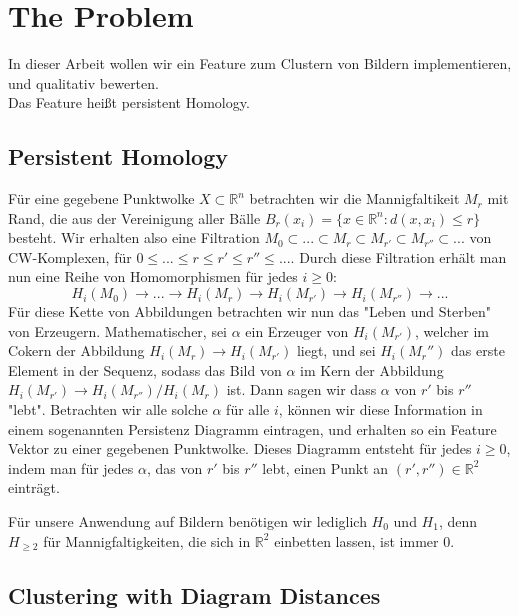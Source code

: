 \documentclass[11pt, a4paper,draft]{report}
\newcommand{\bR}{\mathbb{R}}
\begin{document}
	
	\section*{The Problem}
	
	In dieser Arbeit wollen wir ein Feature zum Clustern von Bildern implementieren, und qualitativ bewerten.\\
	Das Feature heißt persistent Homology. 
	
	\subsection*{Persistent Homology}
	
	Für eine gegebene Punktwolke $X \subset \bR^n$ betrachten wir die Mannigfaltikeit $M_r$ mit Rand, die aus der Vereinigung aller Bälle $B_r(x_i) = \{x\in\bR^n : d(x,x_i)\leq r\}$ besteht. Wir erhalten also eine Filtration $M_0 \subset ... \subset M_r \subset M_{r'} \subset M_{r''} \subset ...$ von CW-Komplexen, für $0\leq ... \leq r \leq r' \leq r'' \leq ...$. Durch diese Filtration erhält man nun eine Reihe von Homomorphismen für jedes $i\geq 0$:
	$$H_i(M_0)\rightarrow ... \rightarrow H_i(M_r) \rightarrow H_i(M_{r'}) \rightarrow H_i(M_{r''}) \rightarrow ...$$
	Für diese Kette von Abbildungen betrachten wir nun das "Leben und Sterben" von Erzeugern. Mathematischer, sei $\alpha$ ein Erzeuger von $H_i(M_{r'})$, welcher im Cokern der Abbildung $H_i(M_r) \rightarrow H_i(M_{r'})$ liegt, und sei $H_i(M_r'')$ das erste Element in der Sequenz, sodass das Bild von $\alpha$ im Kern der Abbildung $H_i(M_{r'}) \rightarrow H_i(M_{r''})/H_i(M_r)$ ist. Dann sagen wir dass $\alpha$ von $r'$ bis $r''$ "lebt". Betrachten wir alle solche $\alpha$ für alle $i$, können wir diese Information in einem sogenannten Persistenz Diagramm eintragen, und erhalten so ein Feature Vektor zu einer gegebenen Punktwolke. Dieses Diagramm entsteht für jedes $i\geq 0$, indem man für jedes $\alpha$, das von $r'$ bis $r''$ lebt, einen Punkt an $(r',r'')\in\bR^2$  einträgt.
	
	Für unsere Anwendung auf Bildern benötigen wir lediglich $H_0$ und $H_1$, denn $H_{\geq2}$ für Mannigfaltigkeiten, die sich in $\bR^2$ einbetten lassen, ist immer 0.
	
	\subsection*{Clustering with Diagram Distances}
	
\end{document}
